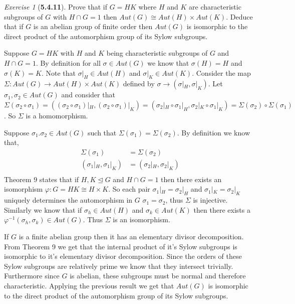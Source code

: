 \documentclass[12pt]{amsart}
\makeatletter
\theoremstyle{remark}
\newtheorem*{exercise}{Exercise}%
\renewenvironment{proof}[1][\proofname]{\par\doublespacing
  \pushQED{\qed}%
  \normalfont \topsep6\p@\@plus6\p@\relax
  \list{}{%
    \settowidth{\leftmargin}{\itshape\proofname:\hskip\labelsep}%
    \setlength{\labelwidth}{0pt}%
    \setlength{\itemindent}{-\leftmargin}%
  }%
  \item[\hskip\labelsep\itshape#1\@addpunct{:}]\ignorespaces
}{%
  \popQED\endlist\@endpefalse
  \singlespacing
}
\theoremstyle{mycomment}
\makeatother
\begin{document}
\begin{exercise}[\textbf{5.4.11}] Prove that if $G = HK$ where $H$ and $K$ are characteristic subgroups of $G$ with $H \cap G = 1$ then $Aut(G) \cong Aut(H) \times Aut(K)$. Deduce that if $G$
  is an abelian group of finite order then $Aut(G)$ is isomorphic to the direct product of the automorphism group of its Sylow subgroups. 
  \begin{proof} Suppose $G = HK$ with $H$ and $K$ being characteristic subgroups of $G$ and $H \cap G = 1$. By definition for all $\sigma \in Aut(G)$ we know that $\sigma(H) = H$ and $\sigma(K) = K$.
    Note that $\sigma|_H \in Aut(H)$ and $\sigma|_K \in Aut(K)$. Consider the map $\Sigma: Aut(G) \to Aut(H) \times Aut(K)$ defined by $\sigma \to (\sigma|_H,\sigma|_K)$.
    Let $\sigma_1, \sigma_2 \in Aut(G)$ and consider that $\Sigma(\sigma_2 \circ \sigma_1) =((\sigma_2 \circ \sigma_1)|_H,(\sigma_2 \circ \sigma_1)|_K) =(\sigma_2|_H \circ \sigma_1|_H,\sigma_2|_K \circ \sigma_1|_K) = \Sigma(\sigma_2) \circ \Sigma (\sigma_1)$. So $\Sigma$ is a homomorphism.
    
    Suppose $\sigma_1. \sigma_2 \in Aut(G)$ such that $\Sigma(\sigma_1) = \Sigma(\sigma_2)$. By definition we know that, 
    \begin{align*}
      \Sigma(\sigma_1) &= \Sigma(\sigma_2)\\
      (\sigma_1|_H, \sigma_1|_K) &= (\sigma_2|_H, \sigma_2|_K)\\
    \end{align*}
    Theorem 9 states that if $H, K \trianglelefteq G$ and $H \cap G = 1$ then there exists an isomorphism $\varphi: G = HK \cong H \times K$. So each pair $\sigma_1|_H = \sigma_2|_H$ and $\sigma_1|_K = \sigma_2|_K$ uniquely determines the automorphism in $G$ $\sigma_1 = \sigma_2$, thus $\Sigma$ is injective. Similarly we know that if $\sigma_h \in Aut(H)$ and $\sigma_k \in Aut(K)$ then there exists a $\varphi^{-1}(\sigma_h, \sigma_k) \in Aut(G)$. Thus $\Sigma$ is an isomorphism.

    If $G$ is a finite abelian group then it has an elementary divisor decomposition. From Theorem 9
    we get that the internal product of it's Sylow subgroups is isomorphic to it's elementary divisor decomposition. Since the orders of these Sylow subgroups are relatively prime we know that they intersect trivially. Furthermore since $G$ is abelian, these subgroups must be normal and therefore characteristic. Applying the previous result we get that $Aut(G)$ is isomorphic to the direct product of the automorphism group of its Sylow subgroups. 
  \end{proof}
\end{exercise}
\vspace{.15in}
\end{document}
